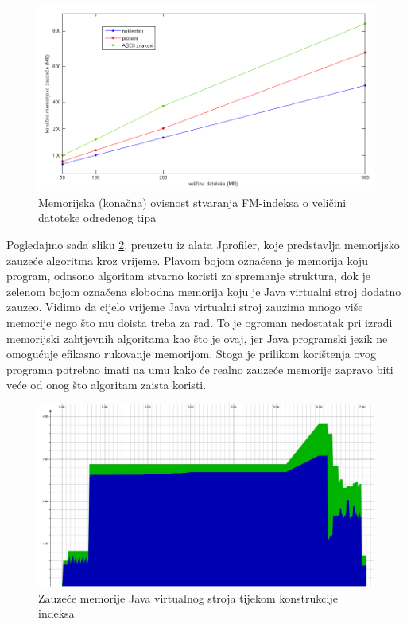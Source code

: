 \begin{figure}[H]
   \centering
       \includegraphics[width=\textwidth]{./pictures/test_mem_kon.png}
 \caption{Memorijska (konačna) ovisnost stvaranja FM-indeksa o veličini datoteke određenog tipa}
 \label{fig:test_mem_kon}
\end{figure}




Pogledajmo sada sliku \ref{fig:profiler}, preuzetu iz alata Jprofiler, koje predstavlja memorijsko zauzeće algoritma kroz vrijeme. Plavom bojom označena je memorija koju program, odnsono algoritam stvarno koristi za spremanje struktura, dok je zelenom bojom označena slobodna memorija koju je Java virtualni stroj dodatno zauzeo. Vidimo da cijelo vrijeme Java virtualni stroj zauzima mnogo više memorije nego što mu doista treba za rad. To je ogroman nedostatak pri izradi memorijski zahtjevnih algoritama kao što je ovaj, jer Java programski jezik ne omogućuje efikasno rukovanje memorijom. Stoga je prilikom korištenja ovog programa potrebno imati na umu kako će realno zauzeće memorije zapravo biti veće od onog što algoritam zaista koristi.

\begin{figure}[H]
   \centering
       \includegraphics[width=\linewidth]{./pictures/profiler.jpg}
 \caption{Zauzeće memorije Java virtualnog stroja tijekom konstrukcije indeksa}
 \label{fig:profiler}
\end{figure}